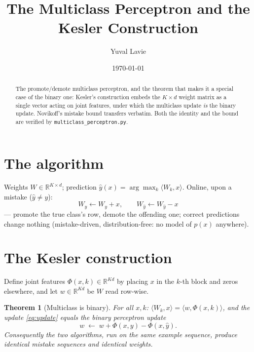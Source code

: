 \documentclass[11pt]{article}
\title{The Multiclass Perceptron and the Kesler Construction}
\author{Yuval Lavie}
\date{\today}
\newtheorem{theorem}{Theorem}
\theoremstyle{remark}
\begin{document}
\maketitle

\begin{abstract}
The promote/demote multiclass perceptron, and the theorem that makes
it a special case of the binary one: Kesler's construction embeds the
$K \times d$ weight matrix as a single vector acting on joint
features, under which the multiclass update \emph{is} the binary
update. Novikoff's mistake bound transfers verbatim. Both the
identity and the bound are verified by
\texttt{multiclass\_perceptron.py}.
\end{abstract}

\section{The algorithm}

Weights $W \in \mathbb{R}^{K \times d}$; prediction
$\hat y(x) = \arg\max_k \langle W_k, x\rangle$. Online, upon a
mistake ($\hat y \ne y$):
\begin{equation}
  W_{y} \leftarrow W_{y} + x, \qquad
  W_{\hat y} \leftarrow W_{\hat y} - x
  \label{eq:update}
\end{equation}
--- promote the true class's row, demote the offending one; correct
predictions change nothing (mistake-driven, distribution-free: no
model of $p(x)$ anywhere).

\section{The Kesler construction}

Define joint features $\Phi(x, k) \in \mathbb{R}^{Kd}$ by placing $x$
in the $k$-th block and zeros elsewhere, and let
$w \in \mathbb{R}^{Kd}$ be $W$ read row-wise.

\begin{theorem}[Multiclass is binary]
\label{thm:kesler}
For all $x, k$: $\langle W_k, x\rangle = \langle w, \Phi(x,k)\rangle$,
and the update \eqref{eq:update} equals the binary perceptron update
\begin{equation}
  w \;\leftarrow\; w + \Phi(x, y) - \Phi(x, \hat y).
  \label{eq:kesler}
\end{equation}
Consequently the two algorithms, run on the same example sequence,
produce identical mistake sequences and identical weights.
\end{theorem}
\end{document}
